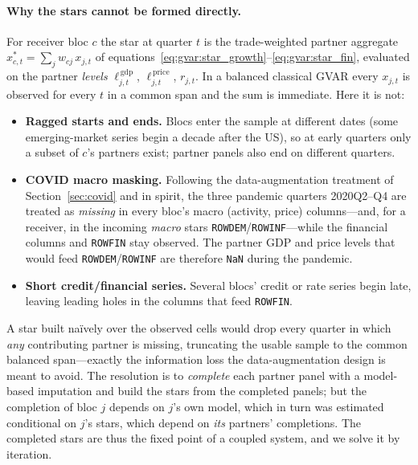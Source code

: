 \documentclass[11pt]{article}
\theoremstyle{definition}
\theoremstyle{remark}
\begin{document}
\paragraph{Why the stars cannot be formed directly.} For receiver bloc $c$ the
star at quarter $t$ is the trade-weighted partner aggregate
$x^{*}_{c,t}=\sum_{j} w_{cj}\,x_{j,t}$ of
equations~\eqref{eq:gvar:star_growth}--\eqref{eq:gvar:star_fin}, evaluated on the
partner \emph{levels} $\ell^{\,\text{gdp}}_{j,t}$, $\ell^{\,\text{price}}_{j,t}$,
$r_{j,t}$. In a balanced classical GVAR every $x_{j,t}$ is observed for every $t$
in a common span and the sum is immediate. Here it is not:
\begin{itemize}
  \item \textbf{Ragged starts and ends.} Blocs enter the sample at different
    dates (some emerging-market series begin a decade after the US), so at early
    quarters only a subset of $c$'s partners exist; partner panels also end on
    different quarters.
  \item \textbf{COVID macro masking.} Following the data-augmentation treatment
    of Section~\ref{sec:covid} and \citet{LenzaPrimiceri2022} in spirit, the
    three pandemic quarters \mbox{2020Q2--Q4} are treated as \emph{missing} in
    every bloc's macro (activity, price) columns---and, for a receiver, in the
    incoming \emph{macro} stars \texttt{ROWDEM}/\texttt{ROWINF}---while the
    financial columns and \texttt{ROWFIN} stay observed. The partner GDP and
    price levels that would feed \texttt{ROWDEM}/\texttt{ROWINF} are therefore
    \texttt{NaN} during the pandemic.
  \item \textbf{Short credit/financial series.} Several blocs' credit or rate
    series begin late, leaving leading holes in the columns that feed
    \texttt{ROWFIN}.
\end{itemize}
A star built na\"ively over the observed cells would drop every quarter in which
\emph{any} contributing partner is missing, truncating the usable sample to the
common balanced span---exactly the information loss the data-augmentation design
is meant to avoid. The resolution is to \emph{complete} each partner panel with a
model-based imputation and build the stars from the completed panels; but the
completion of bloc $j$ depends on $j$'s own model, which in turn was estimated
conditional on $j$'s stars, which depend on \emph{its} partners' completions.
The completed stars are thus the fixed point of a coupled system, and we solve it
by iteration.
\end{document}
